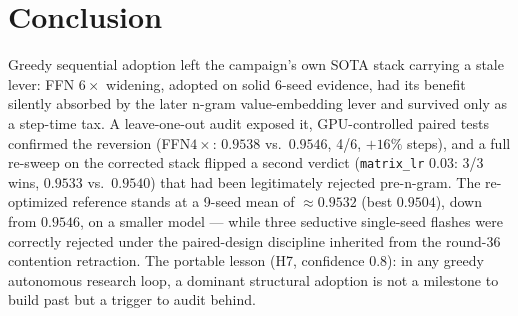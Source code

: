\documentclass{article}
\begin{document}
\section{Conclusion}
\label{sec:conclusion}

Greedy sequential adoption left the campaign's own SOTA stack carrying a stale lever: FFN $6\times$ widening, adopted on solid 6-seed evidence, had its benefit silently absorbed by the later n-gram value-embedding lever and survived only as a step-time tax. A leave-one-out audit exposed it, GPU-controlled paired tests confirmed the reversion (FFN$4\times$: $0.9538$ vs.\ $0.9546$, 4/6, $+16\%$ steps), and a full re-sweep on the corrected stack flipped a second verdict (\texttt{matrix\_lr} $0.03$: 3/3 wins, $0.9533$ vs.\ $0.9540$) that had been legitimately rejected pre-n-gram. The re-optimized reference stands at a 9-seed mean of $\approx 0.9532$ (best $0.9504$), down from $0.9546$, on a smaller model --- while three seductive single-seed flashes were correctly rejected under the paired-design discipline inherited from the round-36 contention retraction. The portable lesson (H7, confidence $0.8$): in any greedy autonomous research loop, a dominant structural adoption is not a milestone to build past but a trigger to audit behind.


\end{document}
